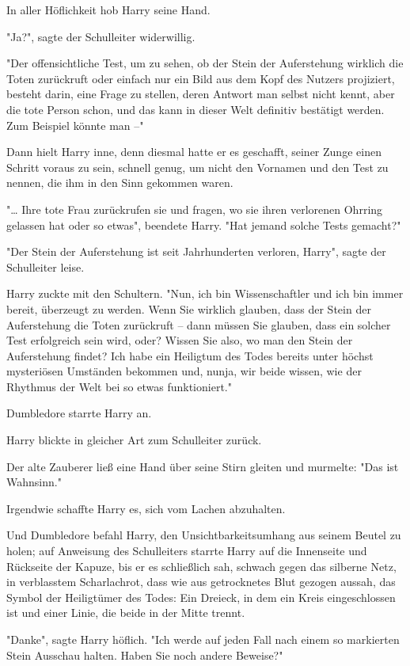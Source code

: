 {In aller Höflichkeit hob Harry seine Hand.

"Ja?", sagte der Schulleiter widerwillig.

"Der offensichtliche Test, um zu sehen, ob der Stein der Auferstehung wirklich die Toten zurückruft oder einfach nur ein Bild aus dem Kopf des Nutzers projiziert, besteht darin, eine Frage zu stellen, deren Antwort man selbst nicht kennt, aber die tote Person schon, und das kann in dieser Welt definitiv bestätigt werden. Zum Beispiel könnte man --"

Dann hielt Harry inne, denn diesmal hatte er es geschafft, seiner Zunge einen Schritt voraus zu sein, schnell genug, um nicht den Vornamen und den Test zu nennen, die ihm in den Sinn gekommen waren.

"… Ihre tote Frau zurückrufen sie und fragen, wo sie ihren verlorenen Ohrring gelassen hat oder so etwas", beendete Harry. "Hat jemand solche Tests gemacht?"

"Der Stein der Auferstehung ist seit Jahrhunderten verloren, Harry", sagte der Schulleiter leise.

Harry zuckte mit den Schultern. "Nun, ich bin Wissenschaftler und ich bin immer bereit, überzeugt zu werden. Wenn Sie wirklich glauben, dass der Stein der Auferstehung die Toten zurückruft -- dann müssen Sie glauben, dass ein solcher Test erfolgreich sein wird, oder? Wissen Sie also, wo man den Stein der Auferstehung findet? Ich habe ein Heiligtum des Todes bereits unter höchst mysteriösen Umständen bekommen und, nunja, wir beide wissen, wie der Rhythmus der Welt bei so etwas funktioniert."

Dumbledore starrte Harry an.

Harry blickte in gleicher Art zum Schulleiter zurück.

Der alte Zauberer ließ eine Hand über seine Stirn gleiten und murmelte: "Das ist Wahnsinn."

Irgendwie schaffte Harry es, sich vom Lachen abzuhalten.

Und Dumbledore befahl Harry, den Unsichtbarkeitsumhang aus seinem Beutel zu holen; auf Anweisung des Schulleiters starrte Harry auf die Innenseite und Rückseite der Kapuze, bis er es schließlich sah, schwach gegen das silberne Netz, in verblasstem Scharlachrot, dass wie aus getrocknetes Blut gezogen aussah, das Symbol der Heiligtümer des Todes: Ein Dreieck, in dem ein Kreis eingeschlossen ist und einer Linie, die beide in der Mitte trennt.

"Danke", sagte Harry höflich. "Ich werde auf jeden Fall nach einem so markierten Stein Ausschau halten. Haben Sie noch andere Beweise?"

}
